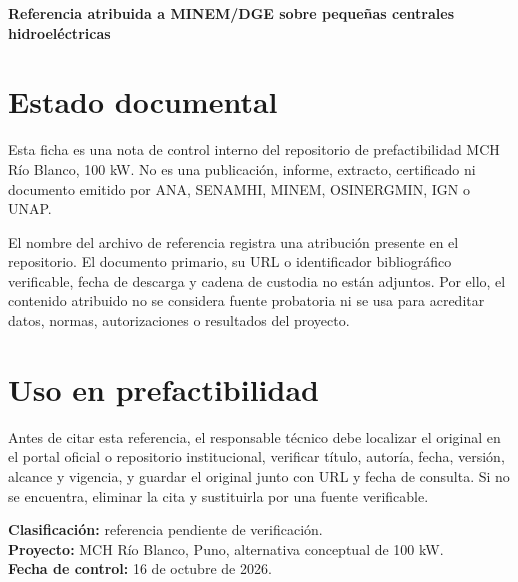 \documentclass[11pt,a4paper]{article}
\begin{document}
\begin{center}\Large\bfseries\color{navy}Referencia atribuida a MINEM/DGE sobre pequeñas centrales hidroeléctricas\end{center}
\vspace{1em}
\section*{Estado documental}
Esta ficha es una nota de control interno del repositorio de prefactibilidad MCH Río Blanco, 100 kW. No es una publicación, informe, extracto, certificado ni documento emitido por ANA, SENAMHI, MINEM, OSINERGMIN, IGN o UNAP.

El nombre del archivo de referencia registra una atribución presente en el repositorio. El documento primario, su URL o identificador bibliográfico verificable, fecha de descarga y cadena de custodia no están adjuntos. Por ello, el contenido atribuido no se considera fuente probatoria ni se usa para acreditar datos, normas, autorizaciones o resultados del proyecto.

\section*{Uso en prefactibilidad}
Antes de citar esta referencia, el responsable técnico debe localizar el original en el portal oficial o repositorio institucional, verificar título, autoría, fecha, versión, alcance y vigencia, y guardar el original junto con URL y fecha de consulta. Si no se encuentra, eliminar la cita y sustituirla por una fuente verificable.

\vfill
\noindent\textbf{Clasificación:} referencia pendiente de verificación.\\
\textbf{Proyecto:} MCH Río Blanco, Puno, alternativa conceptual de 100 kW.\\
\textbf{Fecha de control:} 16 de octubre de 2026.
\end{document}
